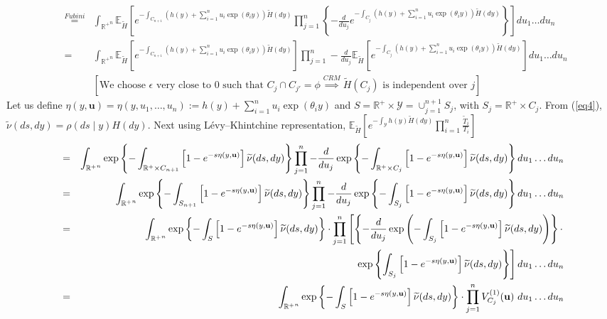 \documentclass[10pt, oneside]{article}   	%
\newcommand{\refa}[1]{\textcolor{blue}{\ref{#1}}}
\renewcommand{\th}{\theta}
\newcommand{\thh}{\widetilde{H}}
\newcommand{\sy}{\mathcal{Y}}
\newcommand{\E}{\mathbb{E}}
\newcommand{\R}{\mathbb{R}}
\renewcommand{\sy}{\mathcal{Y}}
\newcommand{\eps}{\epsilon}
\newcommand{\ub}{\mathbf{u}}
\begin{document}
\begin{eqnarray*}
 & \stackrel{Fubini}{=} &  \int_{{\R^{+}}^n}  \E_{\thh}\left[e^{- \int_{C_{n+1}} \left(h(y) + \sum_{i=1}^n u_i \exp (\th_i y) \right) \thh(dy)} \prod_{j=1}^{n} \left\{ - \frac{d}{du_j} e^{- \int_{C_j} \left(h(y) + \sum_{i=1}^n u_i \exp (\th_i y) \right) \thh(dy)} \right\} \right] d u_1\dots du_n \\
 & = & \int_{{\R^{+}}^n}  \E_{\thh}\left[e^{- \int_{C_{n+1}} \left(h(y) + \sum_{i=1}^n u_i \exp (\th_i y) \right) \thh(dy)} \right] \prod_{j=1}^{n} - \frac{d}{du_j} \E_{\thh}\left[e^{- \int_{C_j} \left(h(y) + \sum_{i=1}^n u_i \exp (\th_i y) \right) \thh(dy)} \right] d u_1\dots du_n \\
  & & \left[\mbox{We choose } \eps \mbox{ very close to } 0 \mbox{ such that } C_j \cap C_{j'} = \phi \stackrel{CRM}{\implies} \thh(C_j) \mbox{ is independent over } j  \right]
\end{eqnarray*}
Let us define $\eta(y, \ub)  = \eta(y, u_1, \dots, u_n) := h(y) + \sum_{i=1}^n u_i \exp (\th_i y)$ and $S = \R^{+} \times \sy = \cup_{j=1}^{n+1} S_j$, with $S_j = \R^{+} \times C_j$. From (\refa{eq4}), $\widetilde \nu(ds, dy) = \rho(ds \mid y) H(dy)$.
Next using L\'evy–Khintchine representation, $\E_{\thh}\left[e^{-\int_\sy h(y) \thh(dy)} \prod_{i = 1}^n \frac{\widetilde T_i}{T_i}\right]$
\begin{eqnarray*}
  & = & \int_{{\R^{+}}^n}   \exp \left \{ - \int_{\R^{+} \times C_{n+1}} \left[1 - e^{- s \eta(y, \ub)} \right] \widetilde{\nu}(ds, dy)\right\}  \prod_{j=1}^{n} - \frac{d}{du_j}  \exp \left \{ - \int_{\R^{+} \times C_{j}} \left[1 - e^{- s \eta(y, \ub)} \right] \widetilde{\nu}(ds, dy)\right\} d u_1\dots du_n \\
   & = & \int_{{\R^{+}}^n}   \exp \left \{ - \int_{S_{n+1}} \left[1 - e^{- s \eta(y, \ub)} \right] \widetilde{\nu}(ds, dy)\right\}  \prod_{j=1}^{n} - \frac{d}{du_j}  \exp \left \{- \int_{S_j} \left[1 - e^{- s \eta(y, \ub)} \right] \widetilde{\nu}(ds, dy)\right\} d u_1\dots du_n \\
   & = & \int_{{\R^{+}}^n}   \exp \left \{ - \int_{S} \left[1 - e^{- s \eta(y, \ub)} \right] \widetilde{\nu}(ds, dy)\right\} \cdot  \prod_{j=1}^{n} \left[\left\{- \frac{d}{du_j}  \exp \left( - \int_{S_j} \left[1 - e^{- s \eta(y, \ub)} \right] \widetilde{\nu}(ds, dy)\right) \right\} \cdot \right. \\
  & & \hspace{7.3cm}  \left.  \exp \left \{ \int_{S_j} \left[1 - e^{- s \eta(y, \ub)} \right] \widetilde{\nu}(ds, dy)\right\} \right]  d u_1\dots du_n \\
 & = & \int_{{\R^{+}}^n}   \exp \left \{ - \int_{S} \left[1 - e^{- s \eta(y, \ub)} \right] \widetilde{\nu}(ds, dy)\right\} \cdot  \prod_{j=1}^{n} V^{(1)}_{C_j}(\ub)  \ d u_1\dots du_n 
\end{eqnarray*}
\end{document}
